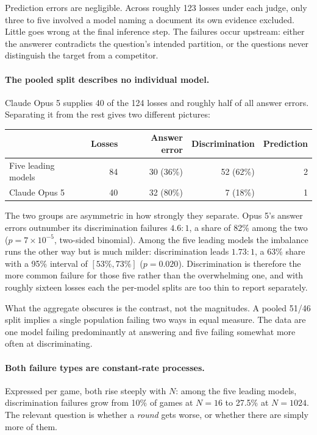 \documentclass[11pt]{article}
\begin{document}
Prediction errors are negligible. Across roughly 123 losses under each judge,
only three to five involved a model naming a document its own evidence
excluded. Little goes wrong at the final inference step. The failures occur
upstream: either the answerer contradicts the question's intended partition, or
the questions never distinguish the target from a competitor.

\paragraph{The pooled split describes no individual model.} Claude Opus 5
supplies 40 of the 124 losses and roughly half of all answer errors. Separating
it from the rest gives two different pictures:

\begin{center}\small
\begin{tabular}{lrrrr}
\toprule
& Losses & Answer error & Discrimination & Prediction \\
\midrule
Five leading models & 84 & 30 (36\%) & 52 (62\%) & 2 \\
Claude Opus 5       & 40 & 32 (80\%) & \phantom{0}7 (18\%) & 1 \\
\bottomrule
\end{tabular}
\end{center}

The two groups are asymmetric in how strongly they separate. Opus 5's answer
errors outnumber its discrimination failures $4.6{:}1$, a share of 82\% among
the two ($p = 7\times10^{-5}$, two-sided binomial). Among the five leading
models the imbalance runs the other way but is much milder: discrimination
leads $1.73{:}1$, a 63\% share with a 95\% interval of $[53\%, 73\%]$
($p=0.020$). Discrimination is therefore the more common failure for those five
rather than the overwhelming one, and with roughly sixteen losses each the
per-model splits are too thin to report separately.

What the aggregate obscures is the contrast, not the magnitudes. A pooled
51/46 split implies a single population failing two ways in equal measure. The
data are one model failing predominantly at answering and five failing somewhat
more often at discriminating.

\paragraph{Both failure types are constant-rate processes.} Expressed per game,
both rise steeply with $N$: among the five leading models, discrimination
failures grow from 10\% of games at $N{=}16$ to 27.5\% at $N{=}1024$. The
relevant question is whether a \emph{round} gets worse, or whether there are
simply more of them.
\end{document}
